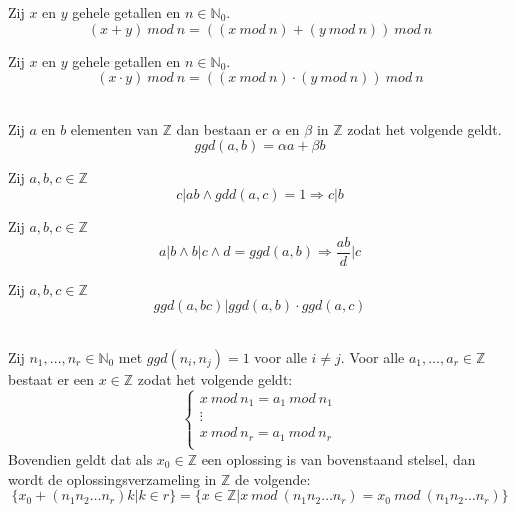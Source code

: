 \documentclass[main.tex]{subfiles}
\begin{document}
\begin{st}
  Zij $x$ en $y$ gehele getallen en $n\in \mathbb{N}_{0}$.
  \[ (x+y)\ mod\ n = ((x\ mod\ n)+(y\ mod\ n))\ mod\ n \]

\end{st}

\begin{st}
  Zij $x$ en $y$ gehele getallen en $n\in \mathbb{N}_{0}$.
  \[ (x\cdot y)\ mod\ n = ((x\ mod\ n)\cdot(y\ mod\ n))\ mod\ n \]

\end{st}


\begin{st}
  \label{st:bezout-bachet}
  \\
  Zij $a$ en $b$ elementen van $\mathbb{Z}$ dan bestaan er $\alpha$ en $\beta$ in $\mathbb{Z}$ zodat het volgende geldt.
  \[ ggd(a,b) = \alpha a + \beta b \]

\end{st}

\begin{st}
  Zij $a,b,c \in \mathbb{Z}$
  \[ c|ab \wedge gdd(a,c) = 1 \Rightarrow c|b \]

\end{st}

\begin{st}
  Zij $a,b,c \in \mathbb{Z}$
  \[ a|b \wedge b|c \wedge d=ggd(a,b) \Rightarrow \frac{ab}{d}|c \]

\end{st}

\begin{st}
  Zij $a,b,c \in \mathbb{Z}$
  \[ ggd(a,bc)|ggd(a,b)\cdot ggd(a,c) \]

\end{st}

\begin{st}
  \\
  Zij $n_{1},\dotsc,n_{r} \in \mathbb{N}_{0}$ met $ggd(n_{i},n_{j}) = 1$ voor alle $i\neq j$.
  Voor alle $a_{1},\dotsc,a_{r} \in \mathbb{Z}$ bestaat er een $x \in \mathbb{Z}$ zodat het volgende geldt:
  \[
  \left\{
    \begin{array}{rl}
    x\ mod\ n_{1} = a_{1}\ mod\ n_{1}\\
    \vdots\\
    x\ mod\ n_{r} = a_{1}\ mod\ n_{r}\\
  \end{array}
  \right.
  \]
  Bovendien geldt dat als $x_{0} \in \mathbb{Z}$ een oplossing is van bovenstaand stelsel, dan wordt de oplossingsverzameling in $\mathbb{Z}$ de volgende:
  \[ \{ x_{0} + (n_{1}n_{2}\dotsc n_{r})k | k \in r\} = \{ x \in \mathbb{Z} | x\ mod\ (n_{1}n_{2}\dotsc n_{r}) = x_{0}\ mod\ (n_{1}n_{2}\dotsc n_{r}) \}\]

\end{st}
\end{document}
